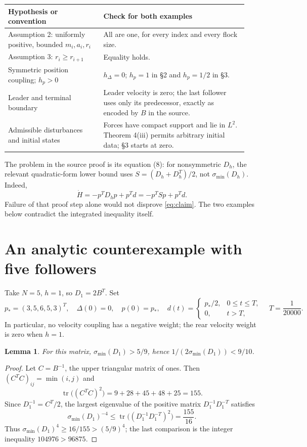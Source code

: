 \documentclass[11pt,letterpaper]{article}
\newcommand{\sig}{\sigma_{\min}}
\newtheorem{lemma}{Lemma}
\begin{document}
\begin{center}
\begin{tabular}{@{}p{0.37\linewidth}p{0.57\linewidth}@{}}
\toprule
Hypothesis or convention & Check for both examples\\
\midrule
Assumption 2: uniformly positive, bounded $m_i,a_i,r_i$
 & All are one, for every index and every flock size.\\[3pt]
Assumption 3: $r_i\geq r_{i+1}$
 & Equality holds.\\[3pt]
Symmetric position coupling; $h_p>0$
 & $h_\Delta=0$; $h_p=1$ in \S2 and $h_p=1/2$ in \S3.\\[3pt]
Leader and terminal boundary
 & Leader velocity is zero; the last follower uses only its predecessor,
 exactly as encoded by $B$ in the source.\\[3pt]
Admissible disturbances and initial states
 & Forces have compact support and lie in $L^2$.
 Theorem 4(iii) permits arbitrary initial data; \S3 starts at zero.\\
\bottomrule
\end{tabular}
\end{center}

The problem in the source proof is its equation (8): for nonsymmetric $D_h$,
the relevant quadratic-form lower bound uses
$S=(D_h+D_h^T)/2$, not $\sig(D_h)$. Indeed,
\[
 \dot H=-p^TD_hp+p^Td=-p^TSp+p^Td.
\]
Failure of that proof step alone would not disprove \eqref{eq:claim}. The two examples
below contradict the integrated inequality itself.

\newpage
\section{An analytic counterexample with five followers}

Take $N=5$, $h=1$, so $D_1=2B^T$. Set
\begin{equation}\label{eq:small-data}
 p_*=(3,5,6,5,3)^T,\quad \Delta(0)=0,\quad p(0)=p_*,
 \quad d(t)=\begin{cases}p_*/2,&0\leq t\leq T,\\0,&t>T,\end{cases}
 \quad T=\frac1{20000}.
\end{equation}
In particular, no velocity coupling has a negative weight; the rear velocity
weight is zero when $h=1$.

\begin{lemma}\label{lem:sigma5}
For this matrix, $\sig(D_1)>5/9$, hence $1/(2\sig(D_1))<9/10$.
\end{lemma}
\begin{proof}
Let $C=B^{-1}$, the upper triangular matrix of ones. Then
$(C^TC)_{ij}=\min(i,j)$ and
\[
 \operatorname{tr}\big((C^TC)^2\big)
 =9+28+45+48+25=155.
\]
Since $D_1^{-1}=C^T/2$, the largest eigenvalue of the positive matrix
$D_1^{-1}D_1^{-T}$ satisfies
\[
 \sig(D_1)^{-4}
 \leq \operatorname{tr}\big((D_1^{-1}D_1^{-T})^2\big)=\frac{155}{16}.
\]
Thus $\sig(D_1)^4\geq16/155>(5/9)^4$; the last comparison is the integer
inequality $104976>96875$.
\end{proof}
\end{document}
